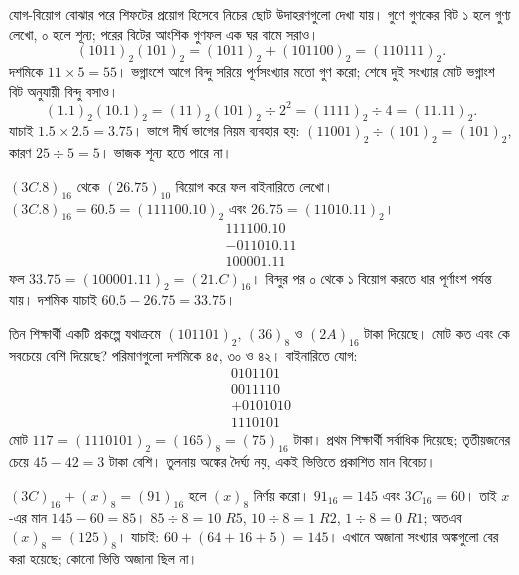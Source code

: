 যোগ-বিয়োগ বোঝার পরে শিফটের প্রয়োগ হিসেবে নিচের ছোট উদাহরণগুলো দেখা যায়। গুণে গুণকের বিট ১ হলে গুণ্য লেখো, ০ হলে শূন্য; পরের বিটের আংশিক গুণফল এক ঘর বামে সরাও।
\[(1011)_2(101)_2=(1011)_2+(101100)_2=(110111)_2.\]
দশমিকে $11\times5=55$। ভগ্নাংশে আগে বিন্দু সরিয়ে পূর্ণসংখ্যার মতো গুণ করো; শেষে দুই সংখ্যার মোট ভগ্নাংশ বিট অনুযায়ী বিন্দু বসাও।
\[(1.1)_2(10.1)_2=(11)_2(101)_2\div2^2=(1111)_2\div4=(11.11)_2.\]
যাচাই $1.5\times2.5=3.75$। ভাগে দীর্ঘ ভাগের নিয়ম ব্যবহার হয়: $(11001)_2\div(101)_2=(101)_2$, কারণ $25\div5=5$। ভাজক শূন্য হতে পারে না।

$(3C.8)_{16}$ থেকে $(26.75)_{10}$ বিয়োগ করে ফল বাইনারিতে লেখো।
\chThreeAnswer $(3C.8)_{16}=60.5=(111100.10)_2$ এবং $26.75=(11010.11)_2$।
\[\begin{array}{r}111100.10\\-011010.11\\\hline100001.11\end{array}\]
ফল $33.75=(100001.11)_2=(21.C)_{16}$। বিন্দুর পর ০ থেকে ১ বিয়োগ করতে ধার পূর্ণাংশ পর্যন্ত যায়। দশমিক যাচাই $60.5-26.75=33.75$।

তিন শিক্ষার্থী একটি প্রকল্পে যথাক্রমে $(101101)_2$, $(36)_8$ ও $(2A)_{16}$ টাকা দিয়েছে। মোট কত এবং কে সবচেয়ে বেশি দিয়েছে?
\chThreeAnswer পরিমাণগুলো দশমিকে ৪৫, ৩০ ও ৪২। বাইনারিতে যোগ:
\[\begin{array}{r}0101101\\0011110\\+0101010\\\hline1110101\end{array}\]
মোট $117=(1110101)_2=(165)_8=(75)_{16}$ টাকা। প্রথম শিক্ষার্থী সর্বাধিক দিয়েছে; তৃতীয়জনের চেয়ে $45-42=3$ টাকা বেশি। তুলনায় অঙ্কের দৈর্ঘ্য নয়, একই ভিত্তিতে প্রকাশিত মান বিবেচ্য।

$(3C)_{16}+(x)_8=(91)_{16}$ হলে $(x)_8$ নির্ণয় করো।
\chThreeAnswer $91_{16}=145$ এবং $3C_{16}=60$। তাই $x$-এর মান $145-60=85$। $85\div8=10\;R5$, $10\div8=1\;R2$, $1\div8=0\;R1$; অতএব $(x)_8=(125)_8$। যাচাই: $60+(64+16+5)=145$। এখানে অজানা সংখ্যার অঙ্কগুলো বের করা হয়েছে; কোনো ভিত্তি অজানা ছিল না।
